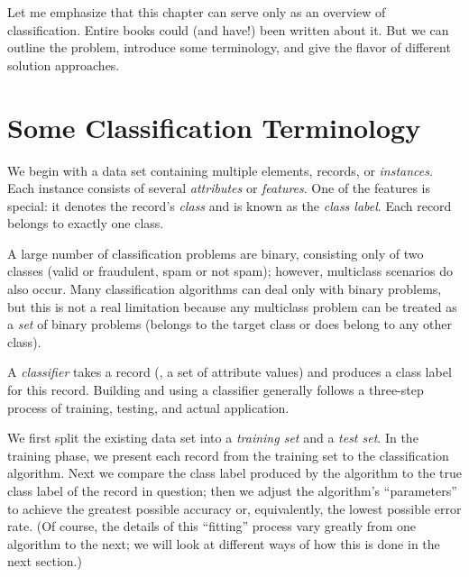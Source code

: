 Let me emphasize that this chapter can serve only as an overview of
classification. Entire books could (and have!) been written about it.
But we can outline the problem, introduce some terminology, and give 
the flavor of different solution approaches.


\leaflong{-13pt}

\section{Some Classification Terminology}

 
We begin with a data set containing multiple elements, records, or
\emph{instances}.  Each instance consists of several \emph{attributes}
or \emph{features}.  One of the features is special: it denotes the
record's \emph{class} and is known as the \emph{class label}. Each
record belongs to exactly one class.

A large number of classification problems are binary, consisting only
of two classes (valid or fraudulent, spam or not spam); however,
multiclass scenarios do also occur. Many classification algorithms can
deal only with binary problems, but this is not a real limitation
because any multiclass problem can be treated as a \emph{set} of
binary problems (belongs to the target class or does belong to any
other class).

A \emph{classifier} takes a record (\ie, a set of attribute values)
and produces a class label for this record. Building and using a
classifier generally follows a three-step process of training,
testing, and actual application.

We first split the existing data set into a \emph{training set}  and a
\emph{test set}.  In the training phase, we present each record from
the training set to the classification algorithm. Next we compare the
class label produced by the algorithm to the true class label of the
record in question; then we adjust the algorithm's ``parameters'' to
achieve the greatest possible accuracy or, equivalently, the lowest
possible error rate. (Of course, the details of this ``fitting''
process vary greatly from one algorithm to the next; we will look at
different ways of how this is done in the next section.)

